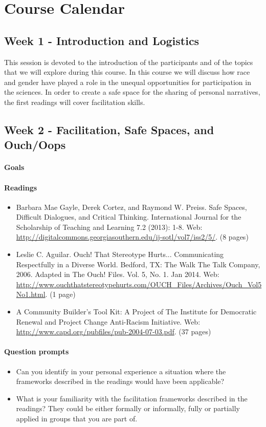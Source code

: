 \documentclass{article}
\begin{document}
\section{Course Calendar}


\subsection{Week 1 - Introduction and Logistics}
This session is devoted to the introduction of the participants and of the topics that we will explore during this course. In this course we will discuss how race and gender have played a role in the unequal opportunities for participation in the sciences. In order to create a safe space for the sharing of personal narratives, the first readings will cover facilitation skills.

\subsection{Week 2 - Facilitation, Safe Spaces, and Ouch/Oops}
\paragraph{Goals} 
\paragraph{Readings}
\begin{itemize}
\item Barbara Mae Gayle, Derek Cortez, and Raymond W. Preiss. Safe Spaces, Difficult Dialogues, and Critical Thinking. International Journal for the Scholarship of Teaching and Learning 7.2 (2013): 1-8. Web: \url{http://digitalcommons.georgiasouthern.edu/ij-sotl/vol7/iss2/5/}. (8 pages)
\item Leslie C. Aguilar. Ouch! That Stereotype Hurts... Communicating Respectfully in a Diverse World. Bedford, TX: The Walk The Talk Company, 2006. Adapted in The Ouch! Files. Vol. 5, No. 1. Jan 2014. Web: \url{http://www.ouchthatstereotypehurts.com/OUCH_Files/Archives/Ouch_Vol5No1.html}. (1 page)
\item A Community Builder's Tool Kit: A Project of The Institute for Democratic Renewal and Project Change Anti-Racism Initiative. Web: \url{http://www.capd.org/pubfiles/pub-2004-07-03.pdf}. (37 pages)
\end{itemize}
\paragraph{Question prompts}
\begin{itemize}
\item Can you identify in your personal experience a situation where the frameworks described in the readings would have been applicable?
\item What is your familiarity with the facilitation frameworks described in the readings? They could be either formally or informally, fully or partially applied in groups that you are part of.
\end{itemize}
\end{document}
